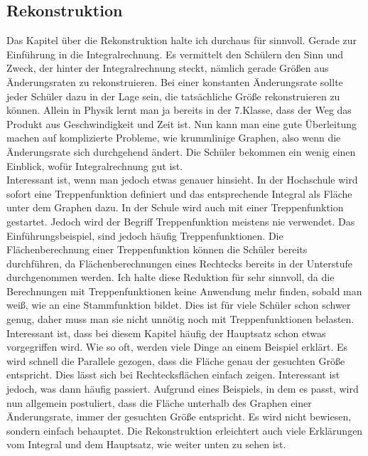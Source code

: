 \documentclass[a4paper]{article}
\begin{document}
\subsection{Rekonstruktion}
Das Kapitel über die Rekonstruktion halte ich durchaus für sinnvoll. Gerade zur Einführung in die Integralrechnung. Es vermittelt den Schülern den Sinn und Zweck, der hinter der Integralrechnung steckt, nämlich gerade Größen aus Änderungsraten zu rekonstruieren. Bei einer konstanten Änderungsrate sollte jeder Schüler dazu in der Lage sein, die tatsächliche Größe rekonstruieren zu können. Allein in Physik lernt man ja bereits in der 7.Klasse, dass der Weg das Produkt aus Geschwindigkeit und Zeit ist. Nun kann man eine gute Überleitung machen auf komplizierte Probleme, wie krummlinige Graphen, also wenn die Änderungsrate sich durchgehend ändert. Die Schüler bekommen ein wenig einen Einblick, wofür Integralrechnung gut ist. \\
Interessant ist, wenn man jedoch etwas genauer hinsieht. 
In der Hochschule wird sofort eine Treppenfunktion definiert und das entsprechende Integral als Fläche unter dem Graphen dazu. In der Schule wird auch mit einer Treppenfunktion gestartet. Jedoch wird der Begriff Treppenfunktion meistens nie verwendet. Das Einführungsbeispiel, sind jedoch häufig Treppenfunktionen. Die Flächenberechnung einer Treppenfunktion können die Schüler bereits durchführen, da Flächenberechnungen eines Rechtecks bereits in der Unterstufe durchgenommen werden. Ich halte diese Reduktion für sehr sinnvoll, da die Berechnungen mit Treppenfunktionen keine Anwendung mehr finden, sobald man weiß, wie an eine Stammfunktion bildet. Dies ist für viele Schüler schon schwer genug, daher muss man sie nicht unnötig noch mit Treppenfunktionen belasten. Interessant ist, dass bei diesem Kapitel häufig der Hauptsatz schon etwas vorgegriffen wird. Wie so oft, werden viele Dinge an einem Beispiel erklärt. Es wird schnell die Parallele gezogen, dass die Fläche genau der gesuchten Größe entspricht. Dies lässt sich bei Rechtecksflächen einfach zeigen. Interessant ist jedoch, was dann häufig passiert. Aufgrund eines Beispiels, in dem es passt, wird nun allgemein postuliert, dass die Fläche unterhalb des Graphen einer Änderungsrate, immer der gesuchten Größe entspricht. Es wird nicht bewiesen, sondern einfach behauptet. Die Rekonstruktion erleichtert auch viele Erklärungen vom Integral und dem Hauptsatz, wie weiter unten zu sehen ist. 
\end{document}
